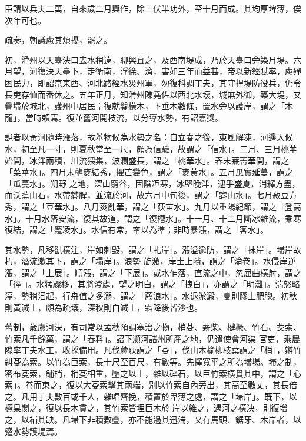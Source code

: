 \begin{pinyinscope}
 臣請以兵夫二萬，自來歲二月興作，除三伏半功外，至十月而成。其均厚埤薄，俟次年可也。



 疏奏，朝議慮其煩擾，罷之。



 初，滑州以天臺決口去水稍遠，聊興葺之，及西南堤成，乃於天臺口旁築月堤。六月望，河復決天臺下，走衛南，浮徐、濟，害如三年而益甚，帝以新經賦率，慮殫困民力，即詔京東西、河北路經水災州軍，勿復科調丁夫，其守捍堤防役兵，仍令長吏存恤而番休之。五年正月，知滑州陳堯佐以西北水壞，城無外御，築大堤，又
 疊埽於城北，護州中居民；復就鑿橫木，下垂木數條，置水旁以護岸，謂之「木龍」，當時賴焉。復並舊河開枝流，以分導水勢，有詔嘉獎。



 說者以黃河隨時漲落，故舉物候為水勢之名：自立春之後，東風解凍，河邊入候水，初至凡一寸，則夏秋當至一尺，頗為信驗，故謂之「信水」。二月、三月桃華始開，冰泮兩積，川流猥集，波瀾盛長，謂之「桃華水」。春末蕪菁華開，謂之「菜華水」。四月末壟麥結秀，擢芒變色，謂之「麥黃水」。五月瓜實延蔓，謂之「瓜蔓水」。朔野
 之地，深山窮谷，固陰冱寒，冰堅晚泮，逮乎盛夏，消釋方盡，而沃蕩山石，水帶礬腥，並流於河，故六月中旬後，謂之「礬山水」。七月菽豆方秀，謂之「豆華水」。八月菼亂華，謂之「荻苗水」。九月以重陽紀節，謂之「登高水」。十月水落安流，復其故道，謂之「復槽水」。十一月、十二月斷冰雜流，乘寒復結，謂之「蹙凌水」。水信有常，率以為準；非時暴漲，謂之「客水」。


其水勢，凡移谼橫注，岸如刺毀，謂之「扎岸」。漲溢逾防，謂之「抹岸」。埽岸故朽，潛流漱其下，謂之「塌岸」。浪勢
 旋激，岸土上隤，謂之「淪卷」。水侵岸逆漲，謂之「上展」。順漲，謂之「下展」。或水乍落，直流之中，忽屈曲橫射，謂之「徑
 」。水猛驟移，其將澄處，望之明白，謂之「拽白」，亦謂之「明灘」。湍怒略渟，勢稍汩起，行舟值之多溺，謂之「薦浪水」。水退淤澱，夏則膠土肥腴。初秋則黃滅土，頗為疏壤，深秋則白滅土，霜降後皆沙也。



 舊制，歲虞河決，有司常以孟秋預調塞治之物，梢芟、薪柴、楗橛、竹石、茭索、竹索凡千餘萬，謂之「春料」。詔下瀕河諸州所產之地，仍遣使會河渠
 官吏，乘農隙率丁夫水工，收採備用。凡伐蘆荻謂之「芟」，伐山木榆柳枝葉謂之「梢」，辮竹糾芟為索。以竹為巨索，長十尺至百尺，有數等。先擇寬平之所為埽場。埽之制，密布芟索，鋪梢，梢芟相重，壓之以土，雜以碎石，以巨竹索橫貫其中，謂之「心索」。卷而束之，復以大芟索擊其兩端，別以竹索自內旁出，其高至數丈，其長倍之。凡用丁夫數百或千人，雜唱齊挽，積置於卑薄之處，謂之「埽岸」。既下，以橛臬閡之，復以長木貫之，其竹索皆埋巨木於
 岸以維之，遇河之橫決，則復增之，以補其缺。凡埽下非積數疊，亦不能遏其迅湍，又有馬頭、鋸牙、木岸者，以蹙水勢護堤焉。




\end{pinyinscope}
